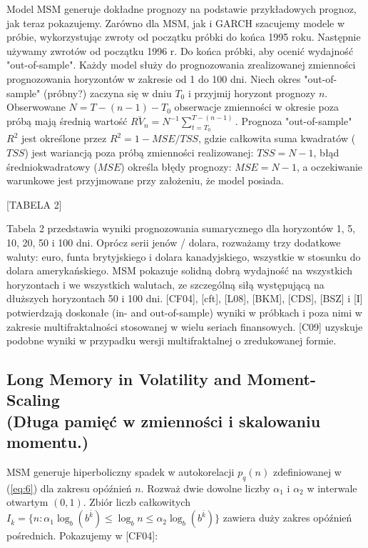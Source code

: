 \documentclass[12pt]{article}
\theoremstyle{definition}
\begin{document}
Model MSM generuje dokładne prognozy na podstawie przykładowych prognoz, jak teraz pokazujemy.
Zarówno dla MSM, jak i GARCH szacujemy modele w próbie, wykorzystując zwroty od początku próbki do końca 1995 roku. Następnie używamy zwrotów od  początku 1996 r. Do końca próbki, aby ocenić wydajność "out-of-sample". Każdy model służy do prognozowania zrealizowanej zmienności prognozowania horyzontów w zakresie od 1 do 100 dni.
Niech okres "out-of-sample" (próbny?) zaczyna się w dniu $T_0$ i przyjmij horyzont prognozy $n$. Obserwowane $N=T-(n-1)-T_0$ obserwacje zmienności w okresie poza próbą mają średnią wartość $\bar{RV_n} =N^{-1} \sum_{t=T_0}^{T-(n-1)}$.
Prognoza "out-of-sample" $R^2$ jest określone przez $R^2 = 1-MSE/TSS$, gdzie całkowita suma kwadratów ($TSS$) jest wariancją poza próbą zmienności realizowanej: $TSS = N-1$, błąd średniokwadratowy ($MSE$) określa błędy prognozy: $MSE = N-1$, a oczekiwanie warunkowe jest przyjmowane przy założeniu, że model posiada.

\begin{center}
[TABELA 2]
\end{center}

Tabela 2 przedstawia wyniki prognozowania sumarycznego dla horyzontów 1, 5, 10, 20, 50 i 100 dni. Oprócz serii jenów / dolara, rozważamy trzy dodatkowe waluty: euro, funta brytyjskiego i dolara kanadyjskiego, wszystkie w stosunku do dolara amerykańskiego. MSM pokazuje solidną dobrą wydajność na wszystkich horyzontach i we wszystkich walutach, ze szczególną siłą występującą na dłuższych horyzontach 50 i 100 dni. [CF04], [cft], [L08], [BKM], [CDS], [BSZ] i [I] potwierdzają doskonałe (in- and out-of-sample) wyniki w próbkach i poza nimi w zakresie multifraktalności stosowanej w wielu seriach finansowych. [C09] uzyskuje podobne wyniki w przypadku wersji multifraktalnej o zredukowanej formie.


\subsection{Long Memory in Volatility and Moment-Scaling\\
(Długa pamięć w zmienności i skalowaniu momentu.)}

MSM generuje hiperboliczny spadek w autokorelacji $p_q(n)$ zdefiniowanej w (\ref{eq:6}) dla zakresu opóźnień $n$. Rozważ dwie dowolne liczby $\alpha_1$ i $\alpha_2$ w interwale otwartym $(0,1)$. Zbiór liczb całkowitych $I_{\bar{k}} = \{n: \alpha_1 \log _b(b^{\bar{k}}) \leq \log _b n \leq \alpha_2 \log _b(b^{\bar{k}}) \}$ zawiera duży zakres opóźnień pośrednich. Pokazujemy w [CF04]:
\end{document}
